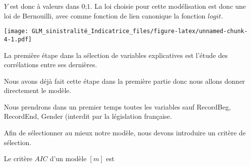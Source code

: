 \documentclass[
]{article}
\newenvironment{Shaded}{\begin{snugshade}}{\end{snugshade}}
\newcommand{\AttributeTok}[1]{\textcolor[rgb]{0.77,0.63,0.00}{#1}}
\newcommand{\DecValTok}[1]{\textcolor[rgb]{0.00,0.00,0.81}{#1}}
\newcommand{\FunctionTok}[1]{\textcolor[rgb]{0.00,0.00,0.00}{#1}}
\newcommand{\NormalTok}[1]{#1}
\newcommand{\OtherTok}[1]{\textcolor[rgb]{0.56,0.35,0.01}{#1}}
\newcommand{\SpecialCharTok}[1]{\textcolor[rgb]{0.00,0.00,0.00}{#1}}
\newcommand{\StringTok}[1]{\textcolor[rgb]{0.31,0.60,0.02}{#1}}
\begin{document}
\(Y\) est donc à valeurs dans \(\text{{0;1}}\). La loi choisie pour
cette modélisation est donc une loi de Bernouilli, avec comme fonction
de lien canonique la fonction \(logit\).

\begin{Shaded}
\end{Shaded}

\texttt{[image: GLM\_sinistralité\_Indicatrice\_files/figure-latex/unnamed-chunk-4-1.pdf]}

La première étape dans la sélection de variables explicatives est
l'étude des corrélations entre ses dernières.

Nous avons déjà fait cette étape dans la première partie donc nous
allons donner directement le modèle.

Nous prendrons dans un premier temps toutes les variables sauf
RecordBeg, RecordEnd, Gender (interdit par la législation française.

Afin de sélectionner au mieux notre modèle, nous devons introduire un
critère de sélection.

Le critère \(AIC\) d'un modèle \([m]\) est
\end{document}
